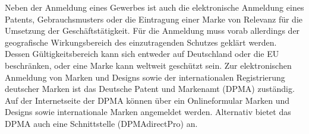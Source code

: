 Neben der Anmeldung eines Gewerbes ist auch die elektronische Anmeldung eines Patents, Gebrauchsmusters oder die Eintragung einer Marke von Relevanz für die Umsetzung der Geschäftstätigkeit. 
Für die Anmeldung muss vorab allerdings der geografische Wirkungsbereich des einzutragenden Schutzes geklärt werden. 
Dessen Gültigkeitsbereich kann sich entweder auf Deutschland oder die EU beschränken, oder eine Marke kann weltweit geschützt sein.
Zur elektronischen Anmeldung von Marken und Designs sowie der internationalen Registrierung deutscher Marken ist das Deutsche Patent und Markenamt (DPMA) zuständig. 
Auf der Internetseite der DPMA können über ein Onlineformular Marken und Designs sowie internationale Marken angemeldet werden. Alternativ bietet das DPMA auch eine Schnittstelle (DPMAdirectPro) an.